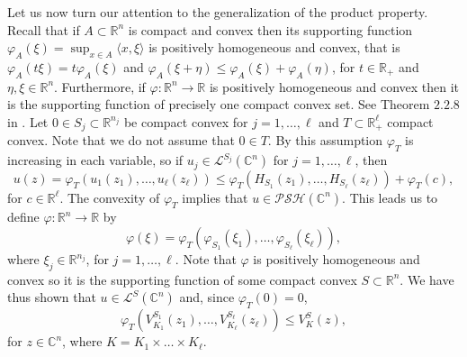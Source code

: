 \documentclass[a4paper,12pt,leqno,english]{article}
\numberwithin{equation}{section}
\begin{document}
Let us now turn our attention to the generalization of the product property.
Recall that if $A \subset \mathbb{R}^n$ is compact and convex then its supporting function
    $\varphi_A(\xi) = \sup_{x \in A} \langle x, \xi \rangle$ is positively homogeneous and convex,
    that is $\varphi_A(t \xi) = t \varphi_A(\xi)$ and $\varphi_A(\xi + \eta) \leq \varphi_A(\xi) + \varphi_A(\eta)$, for
    $t \in \mathbb{R}_+$ and $\eta, \xi \in \mathbb{R}^n$.
Furthermore, if $\varphi \colon \mathbb{R}^n \rightarrow \mathbb{R}$ is positively homogeneous and convex
    then it is the supporting function of precisely one compact convex set.
See Theorem $2.2.8$ in \cite{Hormander:convexity}.
Let $0 \in S_j \subset \mathbb{R}^{n_j}$ be compact convex for $j = 1, \dots, \ell$ and
    $T \subset \mathbb{R}_+^\ell$ compact convex.
Note that we do not assume that $0 \in T$.
By this assumption $\varphi_T$ is increasing in each variable, so if $u_j \in \mathcal{L}^{S_j}(\mathbb{C}^n)$ for $j = 1, \dots, \ell$, then
\begin{equation*}
    u(z)
    =
    \varphi_T(u_1(z_1), \dots, u_\ell(z_\ell))
    \leq
    \varphi_T(H_{S_1}(z_1), \dots, H_{S_\ell}(z_\ell)) + \varphi_T(c),
\end{equation*}
for $c \in \mathbb{R}^\ell$.
The convexity of $\varphi_T$ implies that $u \in \mathcal{PSH}(\mathbb{C}^n)$.
This leads us to define $\varphi \colon \mathbb{R}^n \rightarrow \mathbb{R}$ by
\begin{equation*}
    \varphi(\xi)
    =
    \varphi_T(\varphi_{S_1}(\xi_1), \dots, \varphi_{S_\ell}(\xi_\ell)),
\end{equation*}
where $\xi_j \in \mathbb{R}^{n_j}$, for $j = 1, \dots, \ell$.
Note that $\varphi$ is positively homogeneous and convex so it is the supporting function of some compact convex $S \subset \mathbb{R}^n$.
We have thus shown that $u \in \mathcal{L}^S(\mathbb{C}^n)$ and, since $\varphi_T(0) = 0$,
\begin{equation}
\label{bg:eq.1}
    \varphi_T(V^{S_1}_{K_1}(z_1), \dots, V^{S_\ell}_{K_\ell}(z_\ell))
    \leq
    V^S_K(z),
\end{equation}
for $z \in \mathbb{C}^n$, where $K = K_1 \times \dots \times K_\ell$.
\end{document}

